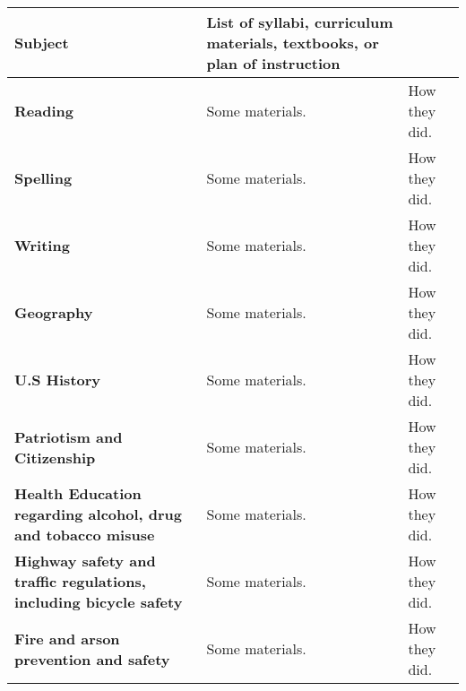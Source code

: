 \documentclass[10pt]{article}
\begin{document}
\newpage 

\noindent\begin{tabularx}{\textwidth}{ |p{2in}|X|X| }

\hline

{\bf Subject} & {\bf List of syllabi, curriculum materials, textbooks,
  or plan of instruction} \\

\hline

{\bf Reading} &

Some materials. &

How they did. \\

\hline

{\bf Spelling} &

Some materials. &

How they did. \\

\hline

{\bf Writing} &

Some materials. &

How they did. \\

\hline

{\bf Geography} &

Some materials. &

How they did. \\

\hline

{\bf U.S History} &

Some materials. &

How they did. \\

\hline

{\bf Patriotism and Citizenship} &

Some materials. &

How they did. \\

\hline

{\bf Health Education regarding alcohol, drug and tobacco misuse} &

Some materials. &

How they did. \\

\hline

{\bf Highway safety and traffic regulations, including bicycle safety} &

Some materials. &

How they did. \\

\hline

{\bf Fire and arson prevention and safety} &

Some materials. &

How they did. \\

\hline

\end{tabularx}
\end{document}
